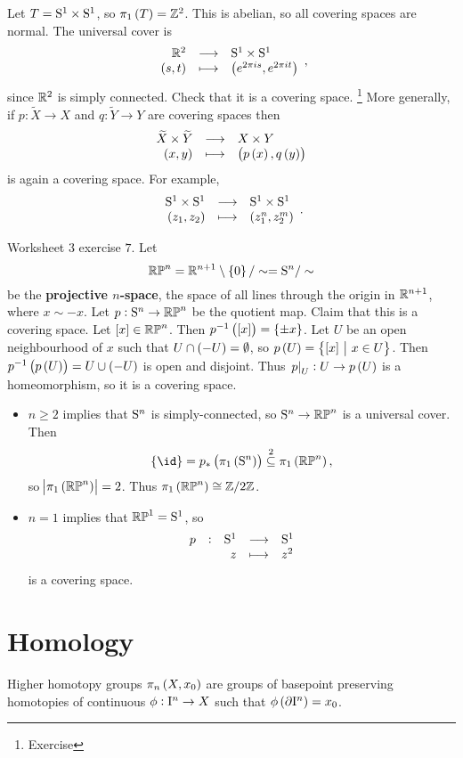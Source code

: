 \begin{example*}
Let $ T = \S^1 \times \S^1 $, so $ \pi_1\br{T} = \ZZ^2 $. This is abelian, so all covering spaces are normal. The universal cover is
$$ \function{\RR^2}{\S^1 \times \S^1}{\br{s, t}}{\br{e^{2\pi is}, e^{2\pi it}}}, $$
since $ \RR^2 $ is simply connected. Check that it is a covering space. \footnote{Exercise} More generally, if $ p : \widetilde{X} \to X $ and $ q : \widetilde{Y} \to Y $ are covering spaces then
$$ \function{\widetilde{X} \times \widetilde{Y}}{X \times Y}{\br{x, y}}{\br{p\br{x}, q\br{y}}} $$
is again a covering space. For example,
$$ \function{\S^1 \times \S^1}{\S^1 \times \S^1}{\br{z_1, z_2}}{\br{z_1^n, z_2^m}}. $$
\end{example*}

\begin{example*}
Worksheet $ 3 $ exercise $ 7 $. Let
$$ \RP^n = \RR^{n + 1} \setminus \cbr{0} / \sim = \S^n / \sim $$
be the \textbf{projective $ n $-space}, the space of all lines through the origin in $ \RR^{n + 1} $, where $ x \sim -x $. Let $ p : \S^n \to \RP^n $ be the quotient map. Claim that this is a covering space. Let $ \sbr{x} \in \RP^n $. Then $ p^{-1}\br{\sbr{x}} = \cbr{\pm x} $. Let $ U $ be an open neighbourhood of $ x $ such that $ U \cap \br{-U} = \emptyset $, so $ p\br{U} = \cbr{\sbr{x} \st x \in U} $. Then $ p^{-1}\br{p\br{U}} = U \cup \br{-U} $ is open and disjoint. Thus $ \eval{p}_U : U \to p\br{U} $ is a homeomorphism, so it is a covering space.
\begin{itemize}
\item $ n \ge 2 $ implies that $ \S^n $ is simply-connected, so $ \S^n \to \RP^n $ is a universal cover. Then
$$ \cbr{\id} = p_*\br{\pi_1\br{\S^n}} \overset{2}{\subseteq} \pi_1\br{\RP^n}, $$
so $ \abs{\pi_1\br{\RP^n}} = 2 $. Thus $ \pi_1\br{\RP^n} \cong \ZZ / 2\ZZ $.
\item $ n = 1 $ implies that $ \RP^1 = \S^1 $, so
$$ \function[p]{\S^1}{\S^1}{z}{z^2} $$
is a covering space.
\end{itemize}
\end{example*}

\pagebreak

\section{Homology}


Higher homotopy groups $ \pi_n\br{X, x_0} $ are groups of basepoint preserving homotopies of continuous $ \phi : \I^n \to X $ such that $ \phi\br{\partial \I^n} = x_0 $.


